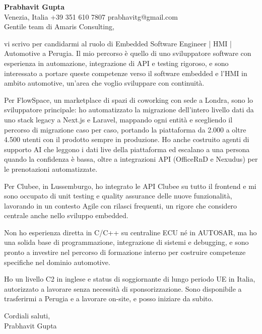 \documentclass[a4paper,10.5pt]{article}
\begin{document}
\textbf{Prabhavit Gupta}\\
Venezia, Italia \textbar{} +39 351 610 7807 \textbar{} prabhavitg@gmail.com\\[10pt]
Gentile team di Amaris Consulting,

vi scrivo per candidarmi al ruolo di Embedded Software Engineer | HMI | Automotive a Perugia. Il mio percorso è quello di uno sviluppatore software con esperienza in automazione, integrazione di API e testing rigoroso, e sono interessato a portare queste competenze verso il software embedded e l'HMI in ambito automotive, un'area che voglio sviluppare con continuità.

Per FlowSpace, un marketplace di spazi di coworking con sede a Londra, sono lo sviluppatore principale: ho automatizzato la migrazione dell'intero livello dati da uno stack legacy a Next.js e Laravel, mappando ogni entità e scegliendo il percorso di migrazione caso per caso, portando la piattaforma da 2.000 a oltre 4.500 utenti con il prodotto sempre in produzione. Ho anche costruito agenti di supporto AI che leggono i dati live della piattaforma ed escalano a una persona quando la confidenza è bassa, oltre a integrazioni API (OfficeRnD e Nexudus) per le prenotazioni automatizzate.

Per Clubee, in Lussemburgo, ho integrato le API Clubee su tutto il frontend e mi sono occupato di unit testing e quality assurance delle nuove funzionalità, lavorando in un contesto Agile con rilasci frequenti, un rigore che considero centrale anche nello sviluppo embedded.

Non ho esperienza diretta in C/C++ su centraline ECU né in AUTOSAR, ma ho una solida base di programmazione, integrazione di sistemi e debugging, e sono pronto a investire nel percorso di formazione interno per costruire competenze specifiche nel dominio automotive.

Ho un livello C2 in inglese e status di soggiornante di lungo periodo UE in Italia, autorizzato a lavorare senza necessità di sponsorizzazione. Sono disponibile a trasferirmi a Perugia e a lavorare on-site, e posso iniziare da subito.

Cordiali saluti,\\
Prabhavit Gupta
\end{document}
